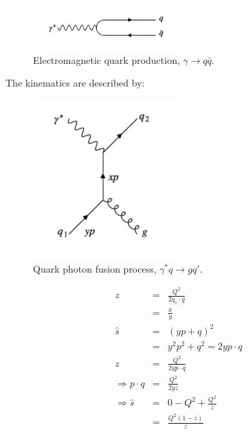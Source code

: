 \begin{figure}[!htb]
  \begin{center}
    \includegraphics[width=0.5\textwidth]{images/web_feynman/image_69.png}
    \caption[Electromagnetic quark production]{Electromagnetic quark production, $\gamma\to q\bar{q}$.}
    \label{fig:ch14_simplePartonDISGammaQQ}
  \end{center}
\end{figure}

The kinematics are described by:

\begin{figure}[!htb]
  \begin{center}
    \includegraphics[width=0.5\textwidth]{images/web_feynman/image_70.png}
    \caption[Quark photon fusion process]{Quark photon fusion process, $\gamma^*q\to gq'$.}
    \label{fig:ch14_QGammaToQG}
  \end{center}
\end{figure}

\begin{eqnarray*}
  z & = & \frac{Q^2}{2q_1 \cdot q} \\
  & = & \frac{x}{y} \\
  \hat{s} & = & \left(yp + q\right)^2 \\
  & = & y^2p^2 + q^2 = 2yp \cdot q \\
  z & = & \frac{Q^2}{2y p \cdot q} \\
  \Rightarrow p \cdot q & = & \frac{Q^2}{2yz} \\
  \Rightarrow \hat{s} & = & 0 - Q^2 + \frac{Q^2}{z} \\
  & = & \frac{Q^2\left(1 - z\right)}{z}
\end{eqnarray*}

